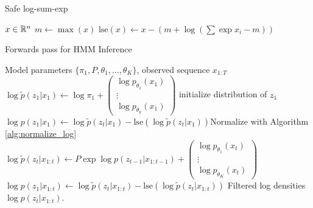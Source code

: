 \documentclass[14pt]{extarticle}
\begin{document}
\begin{algorithm}
   \caption{Safe log-sum-exp}
   \label{alg:normalize_log}
   \begin{algorithmic}
      $x \in \mathbb{R}^{n}$
     \STATE $m \leftarrow \max\left(x\right)$
      $\text{lse}\left(x\right) \leftarrow x - \left(m + \log\left(\sum\exp{x_{i} - m}\right)\right)$
   \end{algorithmic}
\end{algorithm}

\begin{algorithm}
   \caption{Forwards pass for HMM Inference}
   \label{alg:hmm_forwards}
\begin{algorithmic}
   Model parameters $\{\pi_{1}, P, \theta_1, \dots, \theta_K\}$,
  observed sequence $x_{1:T}$
  \STATE $\log \tilde{p}\left(z_{1}\vert x_{1}\right) \leftarrow
  \log\pi_{1} + \begin{pmatrix} \log p_{\theta_{1}}\left(x_{1}\right) \\ \vdots \\ \log p_{\theta_{k}}\left(x_{1}\right) \end{pmatrix}$ \hfill initialize distribution of $z_{1}$
  \STATE $\log p\left(z_{1} \vert x_{1}\right) \leftarrow \log \tilde{p}\left(z_{t} \vert x_{1}\right) - \text{lse}\left(\log \tilde{p}\left(z_{t} \vert x_{1}\right)\right)$\hfill Normalize with Algorithm \ref{alg:normalize_log}
  \STATE $\log \tilde{p}\left(z_{t} \vert x_{1:t}\right) \leftarrow P \exp{\log p\left(z_{t - 1} \vert x_{1:t - 1}\right)} + \begin{pmatrix}  \log p_{\theta_{1}}\left(x_{t}\right) \\ \vdots \\ \log p_{\theta_{K}}\left(x_{t}\right) \end{pmatrix}$
  \STATE $\log p\left(z_{1} \vert x_{1:t}\right) \leftarrow \log \tilde{p}\left(z_{t} \vert x_{1:t}\right) - \text{lse}\left(\log \tilde{p}\left(z_{t} \vert x_{1:t}\right)\right)$\hfill
  \ENDFOR
   Filtered log densities $\log p\left(z_{t} \vert x_{1:t}\right)$.
\end{algorithmic}
\end{algorithm}
\end{document}
